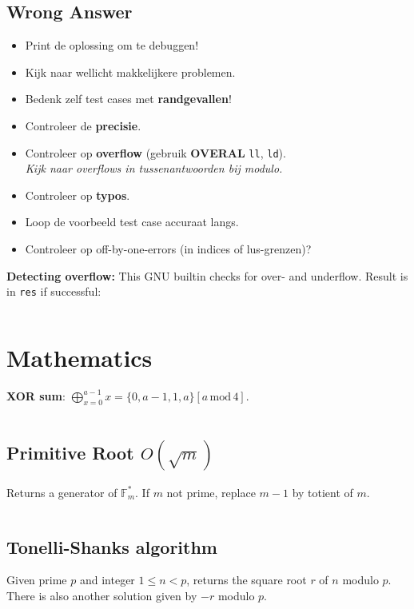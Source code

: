 \documentclass[8pt,a4paper,landscape,oneside]{amsart}
\newcommand{\mintedstyle}[2]{\inputminted[fontsize=\normalsize,baselinestretch=.9,breaklines,breakautoindent,tabsize=2]{#1}{code/#2}}
\newcommand{\code}[1]{\mintedstyle{cpp}{#1}}
\newenvironment{myitemize}
{\begin{itemize}[leftmargin=.3cm]
	\setlength{\itemsep}{0pt}
	\setlength{\parskip}{0pt}
	\setlength{\parsep}{0pt}     }
{ \end{itemize}                  }
\begin{document}
\begin{multicols*}{3}
\subsection{Wrong Answer}

\begin{myitemize}
	\item Print de oplossing om te debuggen!
	\item Kijk naar wellicht makkelijkere problemen.
	\item Bedenk zelf test cases met \textbf{randgevallen}!
	\item Controleer de \textbf{precisie}.
	\item Controleer op \textbf{overflow} (gebruik \textbf{OVERAL} \texttt{ll}, \texttt{ld}).
		\\ \textit{Kijk naar overflows in tussenantwoorden bij modulo.}
	\item Controleer op \textbf{typo\textquotesingle s}.
	\item Loop de voorbeeld test case accuraat langs.
	\item Controleer op off-by-one-errors (in indices of lus-grenzen)?
\end{myitemize}

\textbf{Detecting overflow:}
This GNU builtin checks for over- and underflow. Result is in \texttt{res} if successful:
\code{other/overflow.cpp}

\section{Mathematics}

\textbf{XOR sum}: $\bigoplus_{x=0}^{a - 1} x = \{0, a - 1, 1, a\}[a \, \mathrm{mod} \, 4]$.

\code{math/math.cpp}

\subsection{Primitive Root $O(\sqrt{m})$}
Returns a generator of $\mathbb{F}_m^*$. If $m$ not prime, replace $m-1$ by totient of $m$.
\code{math/primitive_root.cpp}

\subsection{Tonelli-Shanks algorithm}
Given prime $p$ and integer $1\leq n<p$, returns the square root $r$ of
$n$ modulo $p$. There is also another solution given by $-r$ modulo
$p$.
\code{math/tonelli_shanks.cpp}


\end{multicols*}
\end{document}
